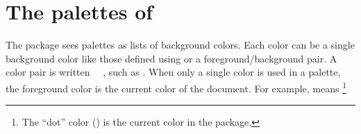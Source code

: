 \documentclass[a4paper, 11pt]{article}
\begin{document}
%
%
%
%
%
%
%
%
%
%


\section{The palettes of }\label{sec:palettes}

The  package sees palettes as lists of background colors. Each color can be a single background color like those defined using  or a foreground/background pair. A color pair is written ~~, such as . When only a single color is used in a palette, the foreground color is the current color of the document. For example,  means \footnote{The ``dot'' color () is the current color in the  package.}
\end{document}
